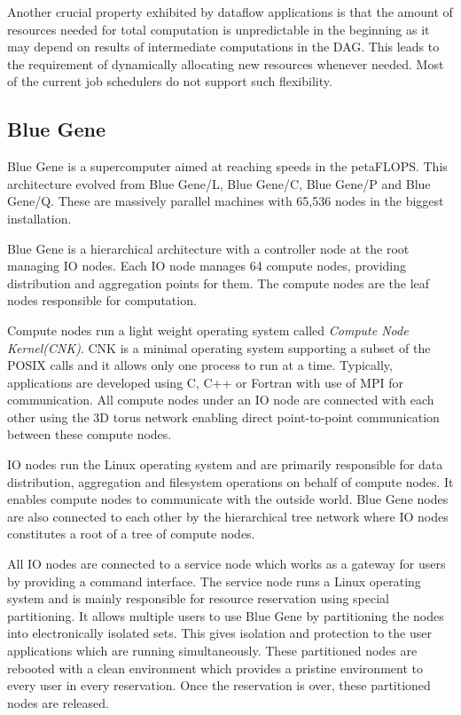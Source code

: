 Another crucial property exhibited by dataflow applications is that the amount of 
resources needed for total computation is unpredictable in the beginning as
it may depend on results of intermediate computations in the DAG.  This leads
to the requirement of dynamically allocating new resources whenever needed.
Most of the current job schedulers do not support such flexibility. 

\subsection{Blue Gene}
Blue Gene \cite{bgp} is a supercomputer aimed at reaching speeds in
the petaFLOPS.  This architecture evolved from Blue Gene/L, Blue Gene/C, Blue Gene/P and Blue Gene/Q.
These are massively parallel machines with 65,536 nodes in the biggest installation.  


Blue Gene is a hierarchical architecture with a controller node at the root managing IO nodes.
Each IO node manages 64 compute nodes, providing distribution and aggregation points for them.
The compute nodes are the leaf nodes responsible for computation.


Compute nodes run a light weight operating system called \textit{Compute Node Kernel(CNK)}.  
CNK is a minimal operating system supporting a subset of the POSIX calls and it allows only one process
to run at a time.  Typically, applications are developed using C, C++ or Fortran with use of 
MPI for communication.  All compute nodes under an IO node are connected with each other using 
the 3D torus network enabling direct point-to-point communication between these compute nodes.


IO nodes run the Linux operating system and are primarily responsible for 
data distribution, aggregation and filesystem operations on behalf of compute nodes.  
It enables compute nodes to communicate with the outside world.
Blue Gene nodes are also connected to each other by the hierarchical tree network 
where IO nodes constitutes a root of a tree of compute nodes.


All IO nodes are connected to a service node which works as a gateway for users
by providing a command interface. The service node runs a Linux operating system and
is mainly responsible for resource reservation using special partitioning.  It
allows multiple users to use Blue Gene by partitioning the nodes into electronically
isolated sets.  This gives isolation and protection to the user applications
which are running simultaneously.  These partitioned nodes are rebooted with a clean 
environment which provides a pristine environment to every user in every reservation.
Once the reservation is over, these partitioned nodes are released.


